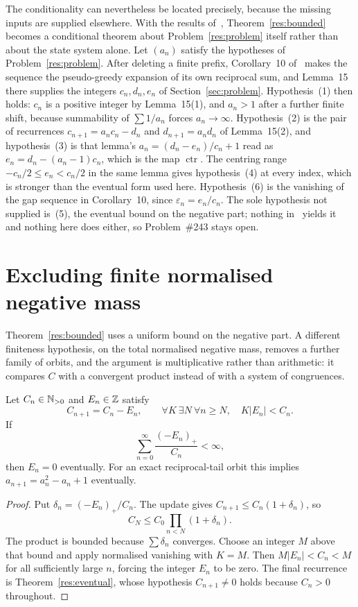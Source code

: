 \documentclass[11pt]{article}
\newcommand{\ctr}{\operatorname{ctr}}
\begin{document}
The conditionality can nevertheless be located precisely, because the missing
inputs are supplied elsewhere.  With the results of~\cite{koizumi2025},
Theorem~\ref{res:bounded} becomes a conditional theorem about
Problem~\ref{res:problem} itself rather than about the state system alone.  Let
$(a_n)$ satisfy the hypotheses of Problem~\ref{res:problem}.  After deleting a
finite prefix, Corollary~10 of~\cite[p.~8]{koizumi2025} makes the sequence the
pseudo-greedy expansion of its own reciprocal sum, and Lemma~15 there supplies
the integers $c_n,d_n,e_n$ of Section~\ref{sec:problem}.  Hypothesis~(1) then
holds: $c_n$ is a positive integer by Lemma~15(1), and $a_n>1$ after a further
finite shift, because summability of $\sum1/a_n$ forces $a_n\to\infty$.
Hypothesis~(2) is the pair of recurrences $c_{n+1}=a_nc_n-d_n$ and
$d_{n+1}=a_nd_n$ of Lemma~15(2), and hypothesis~(3) is that lemma's
$a_n=(d_n-e_n)/c_n+1$ read as $e_n=d_n-(a_n-1)c_n$, which is the map $\ctr$.
The centring range $-c_n/2\le e_n<c_n/2$ in the same lemma gives
hypothesis~(4) at every index, which is stronger than the eventual form used
here.  Hypothesis~(6) is the vanishing
of the gap sequence in Corollary~10, since $\varepsilon_n=e_n/c_n$.  The sole
hypothesis not supplied is~(5), the eventual bound on the negative part;
nothing in~\cite{koizumi2025} yields it and nothing here does either, so
Problem~\#243 stays open.

\section{Excluding finite normalised negative mass}\label{sec:mass}

Theorem~\ref{res:bounded} uses a uniform bound on the negative part.  A
different finiteness hypothesis, on the total normalised negative mass, removes
a further family of orbits, and the argument is multiplicative rather than
arithmetic: it compares $C$ with a convergent product instead of with a system
of congruences.

\begin{theorem}\label{res:mass}
Let \(C_n\in\mathbb{N}_{>0}\) and \(E_n\in\mathbb{Z}\) satisfy
\[
 C_{n+1}=C_n-E_n,\qquad
 \forall K\ \exists N\ \forall n\ge N,\quad K|E_n|<C_n .
\]
If
\[
 \sum_{n=0}^{\infty}\frac{(-E_n)_+}{C_n}<\infty ,
\]
then \(E_n=0\) eventually.  For an exact reciprocal-tail orbit this implies
\(a_{n+1}=a_n^2-a_n+1\) eventually.
\end{theorem}

\begin{proof}
Put \(\delta_n=(-E_n)_+/C_n\).  The update gives
\(C_{n+1}\le C_n(1+\delta_n)\), so
\[
 C_N\le C_0\prod_{n<N}(1+\delta_n).
\]
The product is bounded because \(\sum\delta_n\) converges.  Choose an integer
\(M\) above that bound and apply normalised vanishing with \(K=M\).  Then
\(M|E_n|<C_n<M\) for all sufficiently large \(n\), forcing the integer
\(E_n\) to be zero.  The final recurrence is Theorem~\ref{res:eventual}, whose
hypothesis $C_{n+1}\ne0$ holds because $C_n>0$ throughout.
\end{proof}
\end{document}
